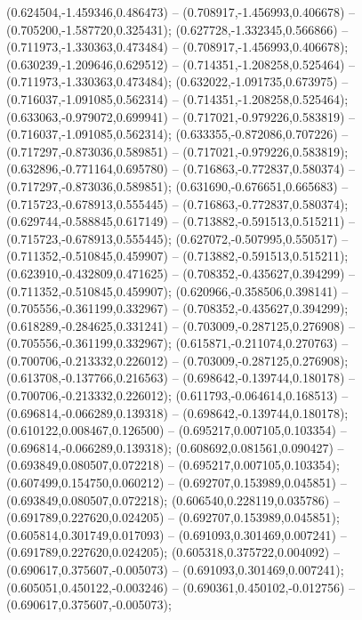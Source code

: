  (0.624504,-1.459346,0.486473) -- (0.708917,-1.456993,0.406678) -- (0.705200,-1.587720,0.325431);
 (0.627728,-1.332345,0.566866) -- (0.711973,-1.330363,0.473484) -- (0.708917,-1.456993,0.406678);
 (0.630239,-1.209646,0.629512) -- (0.714351,-1.208258,0.525464) -- (0.711973,-1.330363,0.473484);
 (0.632022,-1.091735,0.673975) -- (0.716037,-1.091085,0.562314) -- (0.714351,-1.208258,0.525464);
 (0.633063,-0.979072,0.699941) -- (0.717021,-0.979226,0.583819) -- (0.716037,-1.091085,0.562314);
 (0.633355,-0.872086,0.707226) -- (0.717297,-0.873036,0.589851) -- (0.717021,-0.979226,0.583819);
 (0.632896,-0.771164,0.695780) -- (0.716863,-0.772837,0.580374) -- (0.717297,-0.873036,0.589851);
 (0.631690,-0.676651,0.665683) -- (0.715723,-0.678913,0.555445) -- (0.716863,-0.772837,0.580374);
 (0.629744,-0.588845,0.617149) -- (0.713882,-0.591513,0.515211) -- (0.715723,-0.678913,0.555445);
 (0.627072,-0.507995,0.550517) -- (0.711352,-0.510845,0.459907) -- (0.713882,-0.591513,0.515211);
 (0.623910,-0.432809,0.471625) -- (0.708352,-0.435627,0.394299) -- (0.711352,-0.510845,0.459907);
 (0.620966,-0.358506,0.398141) -- (0.705556,-0.361199,0.332967) -- (0.708352,-0.435627,0.394299);
 (0.618289,-0.284625,0.331241) -- (0.703009,-0.287125,0.276908) -- (0.705556,-0.361199,0.332967);
 (0.615871,-0.211074,0.270763) -- (0.700706,-0.213332,0.226012) -- (0.703009,-0.287125,0.276908);
 (0.613708,-0.137766,0.216563) -- (0.698642,-0.139744,0.180178) -- (0.700706,-0.213332,0.226012);
 (0.611793,-0.064614,0.168513) -- (0.696814,-0.066289,0.139318) -- (0.698642,-0.139744,0.180178);
 (0.610122,0.008467,0.126500) -- (0.695217,0.007105,0.103354) -- (0.696814,-0.066289,0.139318);
 (0.608692,0.081561,0.090427) -- (0.693849,0.080507,0.072218) -- (0.695217,0.007105,0.103354);
 (0.607499,0.154750,0.060212) -- (0.692707,0.153989,0.045851) -- (0.693849,0.080507,0.072218);
 (0.606540,0.228119,0.035786) -- (0.691789,0.227620,0.024205) -- (0.692707,0.153989,0.045851);
 (0.605814,0.301749,0.017093) -- (0.691093,0.301469,0.007241) -- (0.691789,0.227620,0.024205);
 (0.605318,0.375722,0.004092) -- (0.690617,0.375607,-0.005073) -- (0.691093,0.301469,0.007241);
 (0.605051,0.450122,-0.003246) -- (0.690361,0.450102,-0.012756) -- (0.690617,0.375607,-0.005073);
